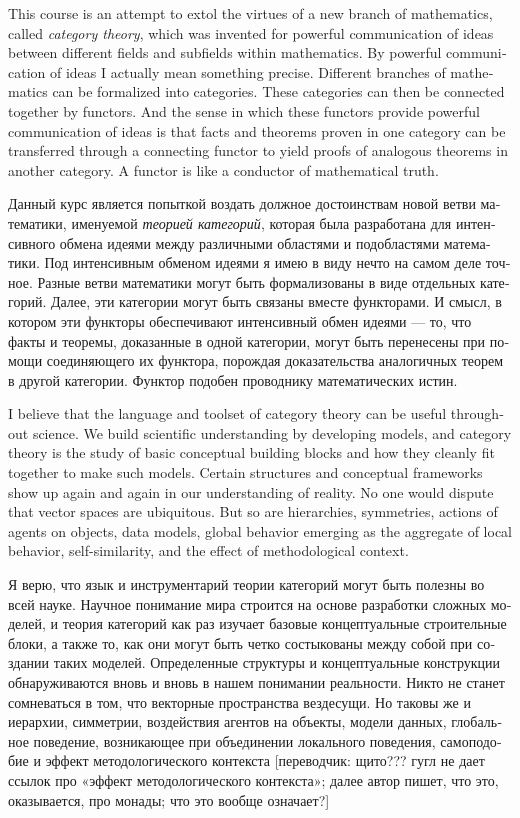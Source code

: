 \documentclass{book}
\theoremstyle{theoremENG}
\theoremstyle{lemmaENG}
\theoremstyle{propositionENG}
\theoremstyle{corollaryENG}
\theoremstyle{factENG}
\theoremstyle{remarkENG}
\theoremstyle{exampleENG}
\theoremstyle{warningENG}
\theoremstyle{questionENG}
\theoremstyle{guessENG}
\theoremstyle{answerENG}
\theoremstyle{constructionENG}
\theoremstyle{rulesENG}
\theoremstyle{excENG}
\theoremstyle{appENG}
\theoremstyle{definitionENG}
\theoremstyle{notationENG}
\theoremstyle{conjectureENG}
\theoremstyle{postulateENG}
\theoremstyle{theoremRUS}
\theoremstyle{lemmaRUS}
\theoremstyle{propositionRUS}
\theoremstyle{corollaryRUS}
\theoremstyle{factRUS}
\theoremstyle{remarkRUS}
\theoremstyle{exampleRUS}
\theoremstyle{warningRUS}
\theoremstyle{questionRUS}
\theoremstyle{guessRUS}
\theoremstyle{answerRUS}
\theoremstyle{constructionRUS}
\theoremstyle{rulesRUS}
\theoremstyle{excRUS}
\theoremstyle{appRUS}
\theoremstyle{definitionRUS}
\theoremstyle{notationRUS}
\theoremstyle{conjectureRUS}
\theoremstyle{postulateRUS}
\begin{document}
\begin{english}
This course is an attempt to extol the virtues of a new branch of mathematics, called {\em category theory}, which was invented for powerful communication of ideas between different fields and subfields within mathematics. By powerful communication of ideas I actually mean something precise. Different branches of mathematics can be formalized into categories. These categories can then be connected together by functors. And the sense in which these functors provide powerful communication of ideas is that facts and theorems proven in one category can be transferred through a connecting functor to yield proofs of analogous theorems in another category. A functor is like a conductor of mathematical truth.

\begin{russian}Данный курс является попыткой воздать должное достоинствам новой ветви математики, именуемой {\em теорией категорий}, которая была разработана для интенсивного обмена идеями между различными областями и подобластями математики. Под интенсивным обменом идеями я имею в виду нечто на самом деле точное. Разные ветви математики могут быть формализованы в виде отдельных категорий. Далее, эти категории могут быть связаны вместе функторами. И смысл, в котором эти функторы обеспечивают интенсивный обмен идеями — то, что факты и теоремы, доказанные в одной категории, могут быть перенесены при помощи соединяющего их функтора, порождая доказательства аналогичных теорем в другой категории. Функтор подобен проводнику математических истин. \end{russian}

I believe that the language and toolset of category theory can be useful throughout science. We build scientific understanding by developing models, and category theory is the study of basic conceptual building blocks and how they cleanly fit together to make such models. Certain structures and conceptual frameworks show up again and again in our understanding of reality. No one would dispute that vector spaces are ubiquitous. But so are hierarchies, symmetries, actions of agents on objects, data models, global behavior emerging as the aggregate of local behavior, self-similarity, and the effect of methodological context.

\begin{russian}Я верю, что язык и инструментарий теории категорий могут быть полезны во всей науке. Научное понимание мира строится на основе разработки сложных моделей, и теория категорий как раз изучает базовые концептуальные строительные блоки, а также то, как они могут быть четко состыкованы между собой при создании таких моделей. Определенные структуры и концептуальные конструкции обнаруживаются вновь и вновь в нашем понимании реальности. Никто не станет сомневаться в том, что векторные пространства вездесущи. Но таковы же и иерархии, симметрии, воздействия агентов на объекты, модели данных, глобальное поведение, возникающее при объединении локального поведения, самоподобие и эффект методологического контекста [переводчик: щито??? гугл не дает ссылок про «эффект методологического контекста»; далее автор пишет, что это, оказывается, про монады; что это вообще означает?] \end{russian}


\end{english}
\end{document}
